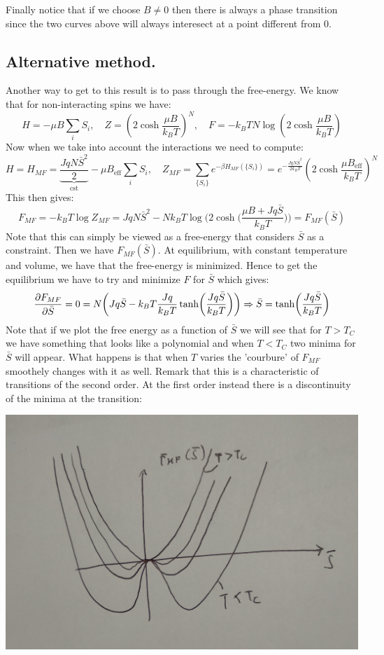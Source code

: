 \documentclass[10pt,a4paper]{book}
\begin{document}
Finally notice that if we choose $B\neq 0$ then there is always a phase transition since the two curves above will always interesect at a point different from 0.
\subsection{Alternative method.}
Another way to get to this result is to pass through the free-energy. We know that for non-interacting spins we have:
\[
H = -\mu B \sum_i S_i, \quad Z = \left(2 \cosh \frac{\mu B}{k_B T}\right)^N, \quad F = -k_B T N \log(2\cosh\frac{\mu B}{k_B T})
\]
Now when we take into account the interactions we need to compute:
\[
H = H_{MF} = \underbrace{\frac{J q N \bar{S}^2}{2}}_{\text{cst}} - \mu B_\text{eff} \sum_i S_i, \quad Z_{MF} = \sum_{\{S_i\}} e^{-\beta H_{MF}(\{S_i\})} = e^{-\frac{Jq N \bar{S}^2}{2 k_B T}} \left(2 \cosh \frac{\mu B_\text{eff}}{k_B T}\right)^N 
\]
This then gives:
\[
F_{MF}  = -k_B T\log Z_{MF} = JqN\bar{S}^2-Nk_BT\log \bigg(2\cosh\bigg(\frac{\mu B+Jq\bar{S}}{k_BT}\bigg)\bigg)=F_{MF}(\bar{S})
\]
Note that this can simply be viewed as a free-energy that considers $\bar{S}$ as a constraint. Then we have $F_{MF}(\bar{S})$. At equilibrium, with constant temperature and volume, we have that the free-energy is minimized. Hence to get the equilibrium we have to try and minimize $F$ for $\bar{S}$ which gives:
\[
\pdv{F_{MF}}{\bar{S}} = 0 = N\bigg(J q \bar{S} - k_B T \frac{J q}{k_B T} \tanh(\frac{J q \bar{S}}{k_B T})\bigg) \Rightarrow \bar{S} = \tanh (\frac{J q \bar{S}}{k_B T})
\]
Note that if we plot the free energy as a function of $\bar{S}$ we will see that for $T > T_C$ we have something that looks like a polynomial and when $T < T_C$ two minima for $\bar{S}$ will appear. What happens is that when $T$ varies the 'courbure' of $F_{MF}$ smoothely changes with it as well. Remark that this is a characteristic of transitions of the second order. At the first order instead there is a discontinuity of the minima at the transition:

\includegraphics[scale=0.1]{graphs/free_en}
\end{document}
